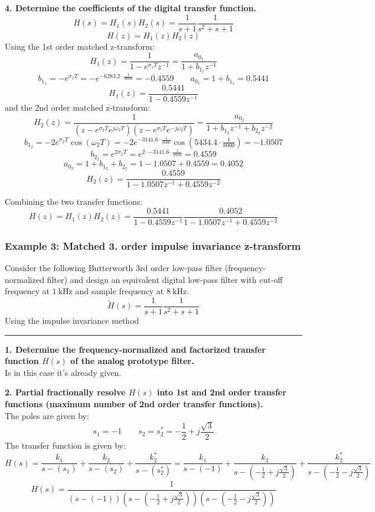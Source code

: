 \textbf{4. Determine the coefficients of the digital transfer function.}
$$H(s)=H_1(s)H_2(s)=\frac{1}{s+1}\frac{1}{s^{2}+s+1}$$
$$H(z)=H_1(z)H_2(z)$$
Using the 1st order matched z-transform:
$$H_1(z)=\frac{1}{1-e^{\sigma_1 T}z^{-1}}=\frac{a_{0_1}}{1+b_{1_1}z^{-1}}$$
$$b_{1_1}=-e^{\sigma_1 T}=-e^{-6283.2\cdot\frac{1}{8000}}=-0.4559\qquad a_{0_1}=1+b_{1_1}=0.5441$$
$$H_1(z)=\frac{0.5441}{1-0.4559z^{-1}}$$
and the 2nd order matched z-transform:
$$H_2(z)={\frac{1}{(z-e^{\sigma_{2}T}e^{j\omega_{2}T})(z-e^{\sigma_{2}T}e^{-j\omega_{2}T})}}=\frac{a_{0_2}}{1+b_{1_2}z^{-1}+b_{2_2}z^{-2}}$$
$$b_{1_2}=-2e^{\sigma_2 T}\cos(\omega_2 T)=-2e^{-3141.6\cdot\frac{1}{8000}}\cos(5434.4\cdot\tfrac{1}{8000})=-1.0507$$
$$b_{2_2}=e^{2\sigma_2 T}=e^{2\cdot -3141.6\cdot\frac{1}{8000}}=0.4559$$
$$a_{0_2}=1+b_{1_2}+b_{2_2}=1-1.0507+0.4559=0.4052$$
$$H_2(z)=\frac{0.4559}{1-1.0507z^{-1}+0.4559z^{-2}}$$

Combining the two transfer functions:
$$H(z)=H_1(z)H_2(z)=\frac{0.5441}{1-0.4559z^{-1}}\frac{0.4052}{1-1.0507z^{-1}+0.4559z^{-2}}$$

\subsubsection{Example 3: Matched 3. order impulse invariance z-transform}
Consider the following Butterworth 3rd order low-pass filter (frequency-normalized filter) 
and design an equivalent digital low-pass filter with cut-off frequency at $\SI{1}{\kilo\hertz}$ and sample frequency at $\SI{8}{\kilo\hertz}$. 
$${\tilde{H}}(s)=\frac{1}{s+1}\frac{1}{s^{2}+s+1}$$
Using the impulse invariance method

\rule{\textwidth}{0.5pt}

\textbf{1. Determine the frequency-normalized and factorized transfer function $H(s)$ of the analog prototype filter.}\\
Is in this case it's already given.

\textbf{2. Partial fractionally resolve $H(s)$ into 1st and 2nd order transfer functions (maximum number of 2nd order transfer functions).}\\
The poles are given by:
$$s_1=-1 \qquad s_2=s_2^*=-\frac{1}{2}+j\frac{\sqrt{3}}{2}$$
The transfer function is given by:
$$H(s)=\frac{k_1}{s-(s_1)}+\frac{k_2}{s-(s_2)}+\frac{k_2^*}{s-(s_2^*)}=\frac{k_1}{s-(-1)}+\frac{k_2}{s-(-\frac{1}{2}+j\frac{\sqrt{3}}{2})}+\frac{k_2^*}{s-(-\frac{1}{2}-j\frac{\sqrt{3}}{2})}$$
$$H(s)=\frac{1}{(s-(-1))(s-(-\frac{1}{2}+j\frac{\sqrt{3}}{2}))(s-(-\frac{1}{2}-j\frac{\sqrt{3}}{2}))}$$

